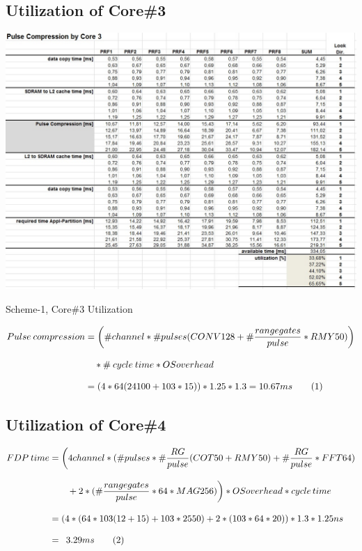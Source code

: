 \subsection{Utilization of Core\#3}
\begin{table}[h!]
	\centering
	\includegraphics[width=160mm]{figures/aa_scheme1_cpu_util_3}
	\caption{Scheme-1, Core\#3 Utilization}
	\label{fig:existing_analysis:aa_scheme1_cpu_util3}
\end{table}
\begin{align*}
	\label{aa:scheme1:core3:equ}
	Pulse \: compression &= \bigg(\#channel * \#pulses (CONV128 +  \# \frac{range gates}{pulse} * RMY50)\bigg)\\[0.3cm]  
	& \quad * \# \: cycle \: time * OSoverhead\\[0.3cm] 
	&= (4 * 64 (24100 + 103 * 15)) * 1.25 * 1.3 = 10.67ms   \stepcounter{equation}\tag{\theequation} 
\end{align*}

\FloatBarrier
\subsection{Utilization of Core\#4}
\begin{align*}
	\label{aa:scheme1:core4:equ1}
	FDP \: time &= \bigg(4channel * (\#pulses * \# \frac{RG}{pulse} (COT50 + RMY50) + \# \frac{RG}{pulse} * FFT64) \\[0.3cm] 
	& \qquad + 2 * (\# \frac{range gates}{pulse} * 64 * MAG256)\bigg) * OSoverhead * cycle \, time \\[0.3cm]
	&= (4 * (64 * 103 (12 + 15) + 103 * 2550) + 2 * (103 * 64 * 20)) * 1.3 * 1.25ns \enspace \\[0.3cm]
	&= \enspace 3.29ms  \stepcounter{equation}\tag{\theequation} 
\end{align*}

